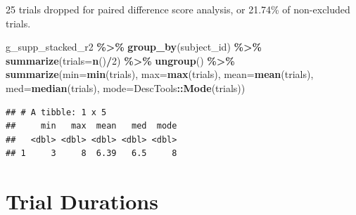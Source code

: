 \documentclass[
  doc,floatsintext]{apa6}
\newenvironment{Shaded}{\begin{snugshade}}{\end{snugshade}}
\newcommand{\AttributeTok}[1]{\textcolor[rgb]{0.13,0.29,0.53}{#1}}
\newcommand{\DecValTok}[1]{\textcolor[rgb]{0.00,0.00,0.81}{#1}}
\newcommand{\FunctionTok}[1]{\textcolor[rgb]{0.13,0.29,0.53}{\textbf{#1}}}
\newcommand{\NormalTok}[1]{#1}
\newcommand{\SpecialCharTok}[1]{\textcolor[rgb]{0.81,0.36,0.00}{\textbf{#1}}}
\begin{document}
25 trials dropped for paired difference score analysis, or 21.74\% of non-excluded trials.

\begin{Shaded}
\begin{Highlighting}[]
\NormalTok{g\_supp\_stacked\_r2 }\SpecialCharTok{\%\textgreater{}\%}
  \FunctionTok{group\_by}\NormalTok{(subject\_id) }\SpecialCharTok{\%\textgreater{}\%}
  \FunctionTok{summarize}\NormalTok{(}\AttributeTok{trials=}\FunctionTok{n}\NormalTok{()}\SpecialCharTok{/}\DecValTok{2}\NormalTok{) }\SpecialCharTok{\%\textgreater{}\%}
  \FunctionTok{ungroup}\NormalTok{() }\SpecialCharTok{\%\textgreater{}\%}
  \FunctionTok{summarize}\NormalTok{(}\AttributeTok{min=}\FunctionTok{min}\NormalTok{(trials),}
            \AttributeTok{max=}\FunctionTok{max}\NormalTok{(trials),}
            \AttributeTok{mean=}\FunctionTok{mean}\NormalTok{(trials),}
            \AttributeTok{med=}\FunctionTok{median}\NormalTok{(trials),}
            \AttributeTok{mode=}\NormalTok{DescTools}\SpecialCharTok{::}\FunctionTok{Mode}\NormalTok{(trials))}
\end{Highlighting}
\end{Shaded}

\begin{verbatim}
## # A tibble: 1 x 5
##     min   max  mean   med  mode
##   <dbl> <dbl> <dbl> <dbl> <dbl>
## 1     3     8  6.39   6.5     8
\end{verbatim}

\section{Trial Durations}\label{trial-durations}
\end{document}

